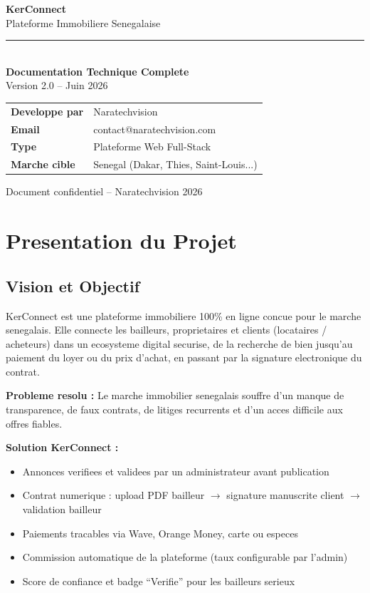 \documentclass[12pt,a4paper]{article}
\begin{document}
\begin{titlepage}
\centering
\vspace*{2cm}
{\Huge\bfseries\textcolor{kerblue}{KerConnect}}\\[0.5em]
{\large\textcolor{kercoral}{Plateforme Immobiliere Senegalaise}}\\[3em]
\rule{12cm}{0.5pt}\\[1.5em]
{\LARGE\bfseries Documentation Technique Complete}\\[1em]
{\large Version 2.0 -- Juin 2026}\\[3em]
\begin{tabular}{ll}
\textbf{Developpe par} & Naratechvision \\
\textbf{Email}         & contact@naratechvision.com \\
\textbf{Type}          & Plateforme Web Full-Stack \\
\textbf{Marche cible}  & Senegal (Dakar, Thies, Saint-Louis...)
\end{tabular}
\vfill
{\small\textcolor{kergray}{Document confidentiel -- Naratechvision 2026}}
\end{titlepage}

\tableofcontents
\newpage

\section{Presentation du Projet}

\subsection{Vision et Objectif}

KerConnect est une plateforme immobiliere 100\% en ligne concue pour le marche senegalais.
Elle connecte les bailleurs, proprietaires et clients (locataires / acheteurs) dans un
ecosysteme digital securise, de la recherche de bien jusqu'au paiement du loyer ou du
prix d'achat, en passant par la signature electronique du contrat.

\textbf{Probleme resolu :} Le marche immobilier senegalais souffre d'un manque de
transparence, de faux contrats, de litiges recurrents et d'un acces difficile aux
offres fiables.

\textbf{Solution KerConnect :}
\begin{itemize}
  \item Annonces verifiees et validees par un administrateur avant publication
  \item Contrat numerique : upload PDF bailleur $\to$ signature manuscrite client $\to$ validation bailleur
  \item Paiements tracables via Wave, Orange Money, carte ou especes
  \item Commission automatique de la plateforme (taux configurable par l'admin)
  \item Score de confiance et badge ``Verifie'' pour les bailleurs serieux
\end{itemize}
\end{document}

